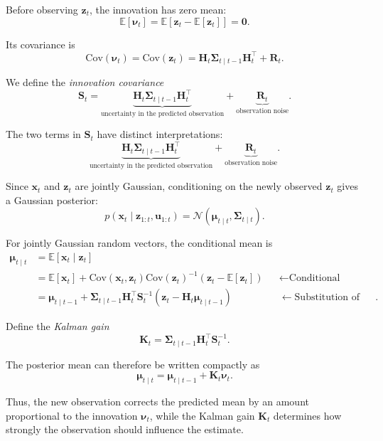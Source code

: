 \documentclass[../Bayesian_Inference.tex]{subfiles}
\begin{document}
Before observing $\bm{z}_t$, the innovation has zero mean:
\[
    \mathbb{E}[\bm{\nu}_t] = \mathbb{E}\left[\bm{z}_t-\mathbb{E}[\bm{z}_t]\right] = \bm{0}.
\]

Its covariance is
\[
    \mathrm{Cov}(\bm{\nu}_t) = \mathrm{Cov}(\bm{z}_t) = \mathbf{H}_t\mathbf{\Sigma}_{t\mid t-1}\mathbf{H}_t^\top + \mathbf{R}_t.
\]

We define the \textit{innovation covariance}
\[
    \mathbf{S}_t = \underbrace{ \mathbf{H}_t\mathbf{\Sigma}_{t\mid t-1}\mathbf{H}_t^\top }_{\text{uncertainty in the predicted observation}} + \underbrace{ \mathbf{R}_t }_{\text{observation noise}}.
\]

The two terms in $\mathbf{S}_t$ have distinct interpretations:
\[
    \underbrace{ \mathbf{H}_t\mathbf{\Sigma}_{t\mid t-1}\mathbf{H}_t^\top }_{\text{uncertainty in the predicted observation}} + \underbrace{ \mathbf{R}_t }_{\text{observation noise}}.
\]

Since $\bm{x}_t$ and $\bm{z}_t$ are jointly Gaussian, conditioning on the newly observed $\bm{z}_t$ gives a Gaussian posterior:
\[
    p(\bm{x}_t\mid\bm{z}_{1:t},\bm{u}_{1:t}) = \mathcal{N}\left( \bm{\mu}_{t\mid t}, \mathbf{\Sigma}_{t\mid t} \right).
\]

For jointly Gaussian random vectors, the conditional mean is
\[
\begin{aligned}
    \bm{\mu}_{t\mid t} &= \mathbb{E}[\bm{x}_t\mid\bm{z}_t] \\
    &= \mathbb{E}[\bm{x}_t] + \mathrm{Cov}(\bm{x}_t,\bm{z}_t) \mathrm{Cov}(\bm{z}_t)^{-1} \left(\bm{z}_t-\mathbb{E}[\bm{z}_t]\right) &&\leftarrow \text{Conditional Gaussian formula} \\
    &= \bm{\mu}_{t\mid t-1} + \mathbf{\Sigma}_{t\mid t-1}\mathbf{H}_t^\top\mathbf{S}_t^{-1} \left(\bm{z}_t-\mathbf{H}_t\bm{\mu}_{t\mid t-1}\right) &&\leftarrow \text{Substitution of mean and covariance}.
\end{aligned}
\]

Define the \textit{Kalman gain}
\[
    \mathbf{K}_t = \mathbf{\Sigma}_{t\mid t-1}\mathbf{H}_t^\top\mathbf{S}_t^{-1}.
\]

The posterior mean can therefore be written compactly as
\[
    \bm{\mu}_{t\mid t} = \bm{\mu}_{t\mid t-1} + \mathbf{K}_t\bm{\nu}_t.
\]

Thus, the new observation corrects the predicted mean by an amount proportional to the innovation $\bm{\nu}_t$, while the Kalman gain $\mathbf{K}_t$ determines how strongly the observation should influence the estimate.
\end{document}
